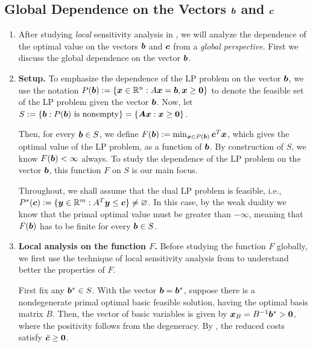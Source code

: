 \subsection{Global Dependence on the Vectors \texorpdfstring{\(\bm{b}\) and \(\bm{c}\)}{b and c}}
\label{subsect:global-dep-bc}
\begin{enumerate}
\item After studying \emph{local} sensitivity analysis in
, we will analyze the dependence of the
optimal value on the vectors \(\bm{b}\) and \(\bm{c}\) from a \emph{global
perspective}.  First we discuss the global dependence on the vector \(\bm{b}\).
\item \textbf{Setup.} To emphasize the dependence of the LP problem on the
vector \(\bm{b}\), we use the notation
\(P(\bm{b}):=\{\bm{x}\in\mathbb{R}^n:A\bm{x}=\bm{b},\bm{x}\ge\bm{0}\}\) to
denote the feasible set of the LP problem given the vector \(\bm{b}\).
Now, let \(S:=\{\bm{b}:P(\bm{b})\text{ is nonempty}\}=\{\bm{A}\bm{x}:\bm{x}\ge\bm{0}\}\).

Then, for every \(\bm{b}\in S\), we define \(F(\bm{b}):=\min_{\bm{x}\in
P(\bm{b})}\bm{c}^{T}\bm{x}\), which gives the optimal value of the LP
problem, as a function of \(\bm{b}\). By construction of \(S\), we know
\(F(\bm{b})<\infty\) always. To study the dependence of the LP problem on the
vector \(\bm{b}\), this function \(F\) on \(S\) is our main focus.

Throughout, we shall assume that the dual LP problem is feasible, i.e.,
\(P^{*}(\bm{c}):=\{\bm{y}\in\mathbb{R}^m:A^{T}\bm{y}\le \bm{c}\}\ne\varnothing\). In this case,
by the weak duality we know that the primal optimal value must be greater than
\(-\infty\), meaning that \(F(\bm{b})\) has to be finite for every
\(\bm{b}\in S\).
\item \textbf{Local analysis on the function \(F\).} Before studying the
function \(F\) globally, we first use the technique of local sensitivity
analysis from  to understand better the
properties of \(F\).

First fix any \(\bm{b}^{*}\in S\). With the vector \(\bm{b}=\bm{b}^{*}\),
suppose there is a nondegenerate primal optimal basic feasible solution, having
the optimal basis matrix \(B\). Then, the vector of basic variables is given by
\(\bm{x}_{B}=B^{-1}\bm{b}^{*}>\bm{0}\), where the positivity follows from
the degeneracy. By , the reduced costs
satisfy \(\bar{\bm{c}}\ge\bm{0}\).


\end{enumerate}
